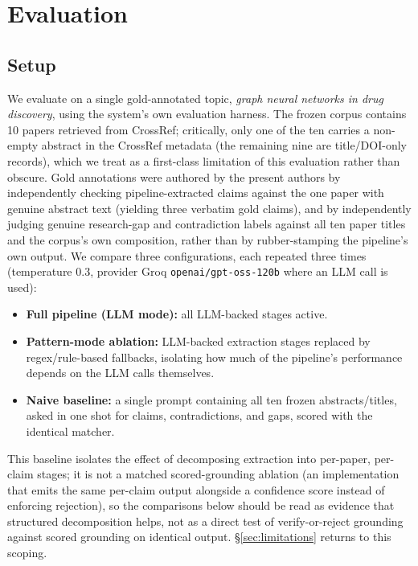 \documentclass[11pt]{article}
\begin{document}
\section{Evaluation}
\label{sec:evaluation}

\subsection{Setup}

We evaluate on a single gold-annotated topic, \textit{graph neural networks in drug discovery}, using the system's own evaluation harness. The frozen corpus contains 10 papers retrieved from CrossRef; critically, only one of the ten carries a non-empty abstract in the CrossRef metadata (the remaining nine are title/DOI-only records), which we treat as a first-class limitation of this evaluation rather than obscure. Gold annotations were authored by the present authors by independently checking pipeline-extracted claims against the one paper with genuine abstract text (yielding three verbatim gold claims), and by independently judging genuine research-gap and contradiction labels against all ten paper titles and the corpus's own composition, rather than by rubber-stamping the pipeline's own output. We compare three configurations, each repeated three times (temperature 0.3, provider Groq \texttt{openai/gpt-oss-120b} where an LLM call is used):
\begin{itemize}
 \item \textbf{Full pipeline (LLM mode):} all LLM-backed stages active.
 \item \textbf{Pattern-mode ablation:} LLM-backed extraction stages replaced by regex/rule-based fallbacks, isolating how much of the pipeline's performance depends on the LLM calls themselves.
 \item \textbf{Naive baseline:} a single prompt containing all ten frozen abstracts/titles, asked in one shot for claims, contradictions, and gaps, scored with the identical matcher.
\end{itemize}
This baseline isolates the effect of decomposing extraction into per-paper, per-claim stages; it is not a matched scored-grounding ablation (an implementation that emits the same per-claim output alongside a confidence score instead of enforcing rejection), so the comparisons below should be read as evidence that structured decomposition helps, not as a direct test of verify-or-reject grounding against scored grounding on identical output. \S\ref{sec:limitations} returns to this scoping.
\end{document}
